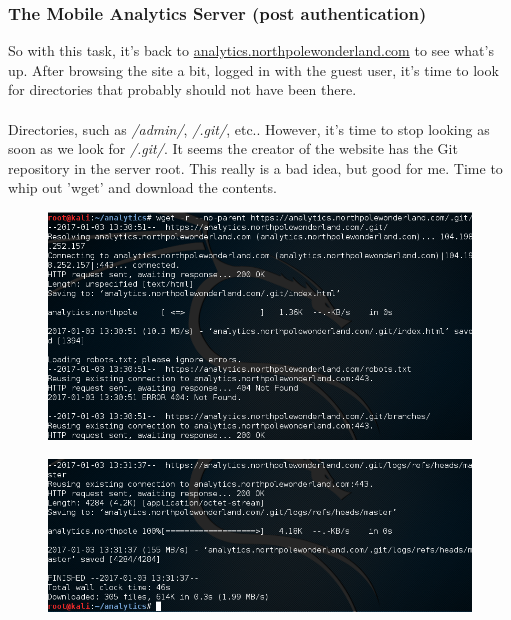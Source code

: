 \documentclass[writeup.tex]{subfiles}
\begin{document}
		\subsubsection{The Mobile Analytics Server (post authentication)}
			So with this task, it's back to \url{analytics.northpolewonderland.com} to see what's up. After browsing the site a bit, logged in with the guest user, it's time to look for directories that probably should not have been there.\\
			\\
			Directories, such as \textit{/admin/}, \textit{/.git/}, etc.. However, it's time to stop looking as soon as we look for \textit{/.git/}. It seems the creator of the website has the Git repository in the server root. This really is a bad idea, but good for me. Time to whip out 'wget' and download the contents.
			
			\begin{figure}[H]
				\centering
				\includegraphics[width=\linewidth]{"screenshots/pwns/Site 7 - wget"}
			\end{figure}
			\begin{figure}[H]
				\centering
				\includegraphics[width=\linewidth]{"screenshots/pwns/Site 7 - wget2"}
			\end{figure}
			
\end{document}
